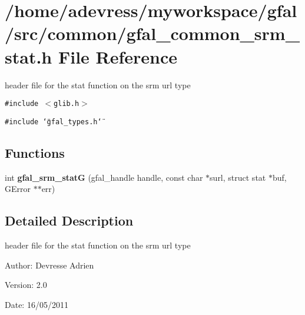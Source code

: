 \section{/home/adevress/myworkspace/gfal/src/common/gfal\_\-common\_\-srm\_\-stat.h File Reference}
\label{gfal__common__srm__stat_8h}
header file for the stat function on the srm url type 

{\tt \#include $<$glib.h$>$}\par
{\tt \#include \char`\"{}gfal\_\-types.h\char`\"{}}\par
\subsection*{Functions}
\begin{CompactItemize}
\item 
int \textbf{gfal\_\-srm\_\-stat\-G} (gfal\_\-handle handle, const char $\ast$surl, struct stat $\ast$buf, GError $\ast$$\ast$err)\label{gfal__common__srm__stat_8h_79b8e4b087251577b48119392e4daa35}

\end{CompactItemize}


\subsection{Detailed Description}
header file for the stat function on the srm url type 

\begin{Desc}
\item[Author:]Devresse Adrien \end{Desc}
\begin{Desc}
\item[Version:]2.0 \end{Desc}
\begin{Desc}
\item[Date:]16/05/2011 \end{Desc}
